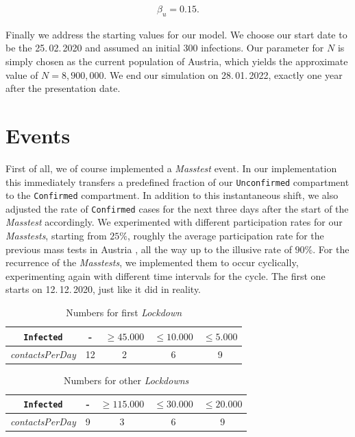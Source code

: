 \documentclass
[
    report,
    11pt,
    bibliography = totoc,
    listof = totoc,
    headinclude = true,
]
{scrreport}
\begin{document}
\begin{align*}
  \beta_u = 0.15.
\end{align*}

Finally we address the starting values for our model. We choose our start date
to be the 25.\,02.\,2020 and assumed an initial 300 infections.
Our parameter for $N$ is simply chosen as the current population of Austria,
which yields the approximate value of $N = 8,900,000$.
We end our simulation on 28.\,01.\,2022, exactly one year after the presentation date.

\section{Events}

First of all, we of course implemented a \textit{Masstest} event. In our implementation
this immediately transfers a predefined fraction of our \texttt{Unconfirmed} compartment
to the \texttt{Confirmed} compartment. In addition to this instantaneous shift, we also
adjusted the rate of \texttt{Confirmed} cases for the next three days after the start of
the \textit{Masstest} accordingly. We experimented with different participation rates
for our \textit{Masstests}, starting from $25\%$, roughly the average participation rate
for the previous mass tests in Austria \cite{MassTests}, all the way up to the illusive rate of $90\%$.
For the recurrence of the \textit{Masstests}, we implemented them to occur cyclically,
experimenting again with different time intervals for the cycle. The first one
starts on 12.\,12.\,2020, just like it did in reality.\\

\begin{table}[!h]
  \begin{center}
  \begin{tabular}{|c||c|c|c|c|}
  \hline
    \texttt{Infected} &- & $\geq 45.000$ & $\leq 10.000$ & $\leq 5.000$ \\
    \hline
    \textit{contactsPerDay} & 12 & 2 & 6 & 9 \\
    \hline
  \end{tabular}
  \end{center}
  \caption{Numbers for first \textit{Lockdown}}
\end{table}

\begin{table}[!h]
  \begin{center}
  \begin{tabular}{|c||c|c|c|c|}
  \hline
    \texttt{Infected} &- & $\geq 115.000$ & $\leq 30.000$ & $\leq 20.000$ \\
    \hline
    \textit{contactsPerDay} & 9 & 3 & 6 & 9 \\
    \hline
  \end{tabular}
  \end{center}
  \caption{Numbers for other \textit{Lockdowns}}
\end{table}
\end{document}
